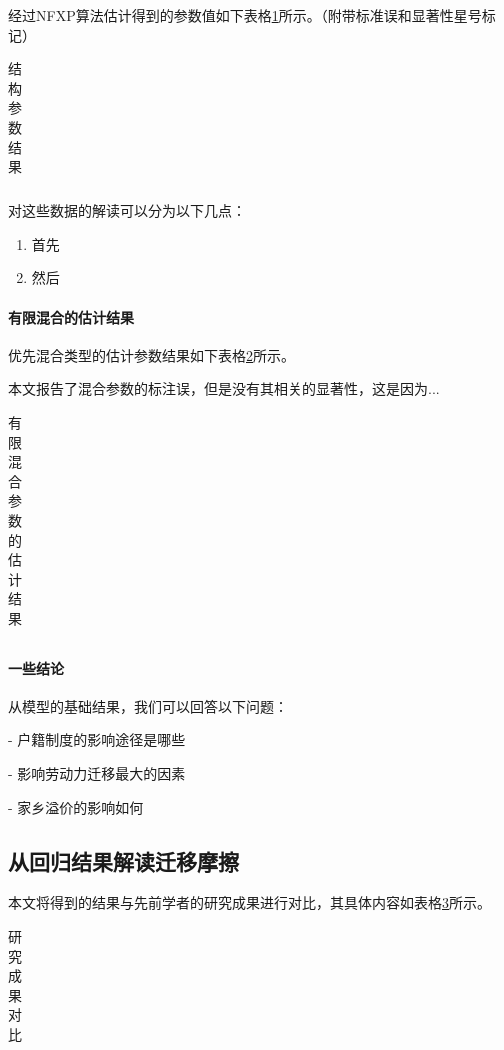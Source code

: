 \documentclass[
  a4paper,
  zihao=-4,
  fontset=mac,
  AutoFakeBold,
  AutoFakeSlant,
  oneside]{ctexbook}
\begin{document}
经过NFXP算法估计得到的参数值如下表格\ref{tab:结构参数的估计结果}所示。（附带标准误和显著性星号标记）
\begin{table}[!ht]
\centering
\caption{结构参数结果}
\begin{tabularx}{\textwidth}{@{}cXXX@{}}
\toprule
\midrule
\bottomrule
\end{tabularx}
\label{tab:结构参数的估计结果}
\end{table}

对这些数据的解读可以分为以下几点：
\begin{enumerate}
  \item 首先
  \item 然后
\end{enumerate}


\paragraph{有限混合的估计结果} 

优先混合类型的估计参数结果如下表格\ref{tab:有限混合参数的估计结果}所示。

本文报告了混合参数的标注误，但是没有其相关的显著性，这是因为...

\begin{table}[!ht]
\centering
\caption{有限混合参数的估计结果}
\begin{tabularx}{\textwidth}{@{}cXXX@{}}
\toprule
\midrule
\bottomrule
\end{tabularx}
\label{tab:有限混合参数的估计结果}
\end{table}


\paragraph{一些结论}

从模型的基础结果，我们可以回答以下问题：

- 户籍制度的影响途径是哪些

- 影响劳动力迁移最大的因素

- 家乡溢价的影响如何


\subsection{从回归结果解读迁移摩擦}
本文将得到的结果与先前学者的研究成果进行对比，其具体内容如表格\ref{tab:研究成果对比}所示。
\begin{table}[!ht]
\centering
\caption{研究成果对比}
\begin{tabularx}{\textwidth}{@{}cXXX@{}}
\toprule
\midrule
\bottomrule
\end{tabularx}
\label{tab:研究成果对比}
\end{table}
\end{document}
